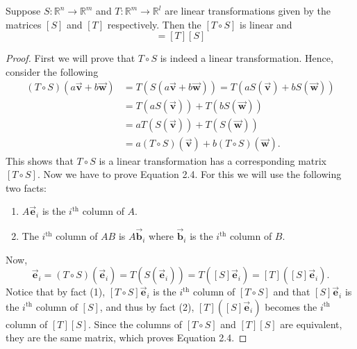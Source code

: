 \documentclass[12pt]{article}
\theoremstyle{remark}
\let\oldvec = \vec
\renewcommand{\vec}[1]{\oldvec{\mathbf{#1}}}
\numberwithin{equation}{section}
\begin{document}
\begin{important}
	Suppose $ S : \mathbb{R}^n \rightarrow \mathbb{R}^m $ and $ T : \mathbb{R}^m \rightarrow \mathbb{R}^l $ are linear transformations given by the matrices $ [S] $ and $ [T] $ respectively. Then the $ [T \circ S] $ is linear and 
	\begin{equation}
		[T \circ S] = [T][S]
	\end{equation}
	
    
\end{important}

\begin{proof}
    First we will prove that $ T \circ S $ is indeed a linear transformation. Hence, consider the following 
    \begin{align*}
	    ( T \circ S )(a \vec{v} + b \vec{w}) &= T(S(a \vec{v} + b \vec{w})) = T(a S(\vec{v}) + b S(\vec{w})) \\ 
						 &= T(a S(\vec{v})) + T(b S(\vec{w})) \\ 
						 &= a T(S(\vec{v})) + T(S(\vec{w})) \\ 
						 &= a(T \circ S)(\vec{v}) + b(T \circ S)(\vec{w}). 
    \end{align*}
    This shows that $ T \circ S $ is a linear transformation has a corresponding matrix $ [T \circ S] $. Now we have to prove Equation 2.4. For this we will use the following two facts: 
    \begin{enumerate}
	\item $ A \vec{e}_{i} $ is the $ i^{\text{th}} $ column of $ A $.
	\item The $ i^{\text{th}} $ column of $ AB $ is $ A \vec{b}_{i} $ where $ \vec{b}_{i} $ is the $ i^{\text{th}} $ column of $ B $.
    \end{enumerate}
    Now, 
    \begin{equation}
	    [T \circ S] \vec{e}_{i} = (T \circ S)(\vec{e}_{i}) = T(S(\vec{e}_{i})) %
	    = T([S]\vec{e}_{i}) = [T]([S]\vec{e}_{i}).
    \end{equation}
    Notice that by fact (1), $ [T \circ S]\vec{e}_{i} $ is the $ i^{\text{th}} $ column of $ [T \circ S] $ and that $ [S]\vec{e}_{i} $ is the $ i^{\text{th}} $ column of $ [S] $, and thus by fact (2), $ [T]([S]\vec{e}_{i}) $ becomes the $ i^{\text{th}} $ column of $ [T][S] $. Since the columns of $ [T \circ S] $ and $ [T][S] $ are equivalent, they are the same matrix, which proves Equation 2.4.
\end{proof}
\end{document}
